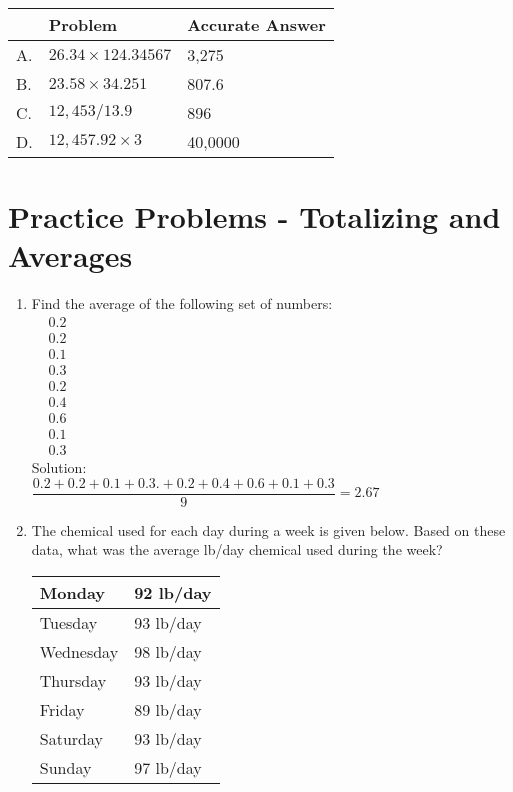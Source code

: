 \begin{tabular}{|l|l|l|}
\hline
 & Problem & Accurate Answer \\
\hline
A. & $26.34 \times 124.34567$ & 3,275  \\
\hline
B. & $23.58 \times 34.251$ & 807.6 \\
\hline
C. & $12,453 / 13.9$  & 896\\
\hline
D. & $12,457.92 \times 3$ & 40,0000  \\
\hline
\end{tabular}
\section*{Practice Problems - Totalizing and Averages}
\begin{enumerate}
\item Find the average of the following set of numbers:\\
$
\begin{aligned}
&0.2 \\
&0.2 \\
&0.1 \\
&0.3 \\
&0.2 \\
&0.4 \\
&0.6 \\
&0.1 \\
&0.3
\end{aligned}$\\
\vspace{0.2cm}
Solution:\\
\vspace{0.2cm}
$\dfrac{0.2+0.2+0.1+0.3.+0.2+0.4+0.6+0.1+0.3}{9}=\boxed{2.67}$
\vspace{0.2cm}
\item The chemical used for each day during a week is given below. Based on these data, what was the average lb/day chemical used during the week?\\
\vspace{0.2cm}
\begin{tabular}{|l|l|}
\hline
Monday & 92 lb/day\\
\hline
Tuesday & 93 lb/day \\
\hline
Wednesday & 98 lb/day\\
\hline
Thursday & 93 lb/day \\
\hline
Friday & 89 lb/day\\
\hline
Saturday & 93 lb/day \\
\hline
Sunday & 97 lb/day\\

\end{tabular}
\end{enumerate}
